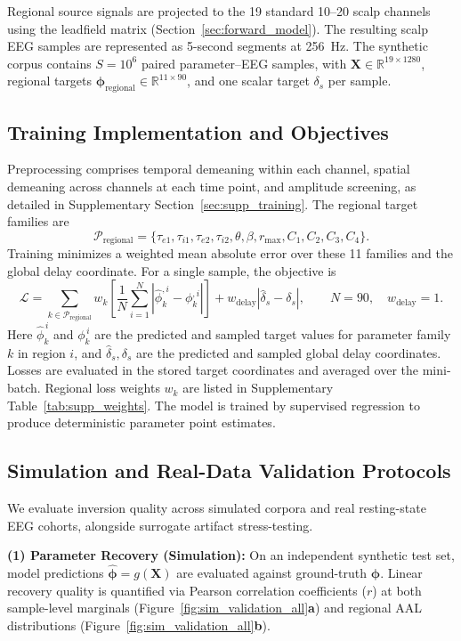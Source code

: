 \documentclass{article}
\begin{document}
{Regional source signals are projected to the 19 standard 10--20 scalp channels using the leadfield matrix (Section~\ref{sec:forward_model}). The resulting scalp EEG samples are represented as 5-second segments at 256~Hz. The synthetic corpus contains $S=10^6$ paired parameter--EEG samples, with $\mathbf X\in\mathbb R^{19\times1280}$, regional targets $\boldsymbol\phi_{\mathrm{regional}}\in\mathbb R^{11\times90}$, and one scalar target $\delta_s$ per sample.

\subsection{Training Implementation and Objectives}
Preprocessing comprises temporal demeaning within each channel, spatial demeaning across channels at each time point, and amplitude screening, as detailed in Supplementary Section~\ref{sec:supp_training}. The regional target families are
\[
\mathcal P_{\mathrm{regional}}=
\{\tau_{e1},\tau_{i1},\tau_{e2},\tau_{i2},\theta,\beta,r_{\max},C_1,C_2,C_3,C_4\}.
\]
Training minimizes a weighted mean absolute error over these 11 families and the global delay coordinate. For a single sample, the objective is
\begin{equation}
\mathcal L=
\sum_{k\in\mathcal P_{\mathrm{regional}}}w_k
\left[\frac{1}{N}\sum_{i=1}^{N}
\left|\widehat\phi_k^{,i}-\phi_k^{,i}\right|\right]
+w_{\mathrm{delay}}\left|\widehat\delta_s-\delta_s\right|,
\qquad N=90,\quad w_{\mathrm{delay}}=1.
\tag{5}\label{eq:loss}
\end{equation}
Here $\widehat\phi_k^{\,i}$ and $\phi_k^{\,i}$ are the predicted and sampled target values for parameter family $k$ in region $i$, and $\widehat\delta_s,\delta_s$ are the predicted and sampled global delay coordinates. Losses are evaluated in the stored target coordinates and averaged over the mini-batch. Regional loss weights $w_k$ are listed in Supplementary Table~\ref{tab:supp_weights}. The model is trained by supervised regression to produce deterministic parameter point estimates.

\subsection{Simulation and Real-Data Validation Protocols}
\label{sec:sim_validation_methods}
We evaluate inversion quality across simulated corpora and real resting-state EEG cohorts, alongside surrogate artifact stress-testing.

\textbf{(1) Parameter Recovery (Simulation):} On an independent synthetic test set, model predictions $\hat{\boldsymbol{\phi}}=g(\mathbf{X})$ are evaluated against ground-truth $\boldsymbol{\phi}$. Linear recovery quality is quantified via Pearson correlation coefficients ($r$) at both sample-level marginals (Figure~\ref{fig:sim_validation_all}\textbf{a}) and regional AAL distributions (Figure~\ref{fig:sim_validation_all}\textbf{b}).

}
\end{document}
